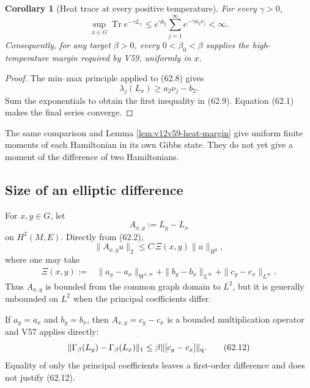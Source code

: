 \documentclass[11pt]{article}
\newtheorem{corollary}[theorem]{Corollary}
\theoremstyle{remark}
\begin{document}
\begin{corollary}[Heat trace at every positive temperature]
\label{cor:v12v62-heat}
For every \(\gamma>0\),
\begin{equation}
 \sup_{x\in G}\operatorname{Tr}e^{-\gamma L_x}
 \leq
 e^{\gamma b_2}
 \sum_{j=1}^\infty e^{-\gamma a_2\nu_j}
 <\infty.                                         \tag{62.9}
\end{equation}
Consequently, for any target \(\beta>0\), every
\(0<\beta_0<\beta\) supplies the high-temperature margin required
by V59, uniformly in \(x\).
\end{corollary}

\begin{proof}
The min--max principle applied to (62.8) gives
\[
 \lambda_j(L_x)\geq a_2\nu_j-b_2.
\]
Sum the exponentials to obtain the first inequality in (62.9).
Equation (62.1) makes the final series converge.
\end{proof}

The same comparison and Lemma \ref{lem:v12v59-heat-margin} give
uniform finite moments of each Hamiltonian in its own Gibbs state.
They do not yet give a moment of the difference of two Hamiltonians.

\subsection{Size of an elliptic difference}

For \(x,y\in G\), let
\[
                         A_{x,y}:=L_y-L_x
\]
on \(H^2(M,E)\).  Directly from (62.2),
\begin{equation}
 \|A_{x,y}u\|_2
 \leq
 C\,\Xi(x,y)\|u\|_{H^2},                          \tag{62.10}
\end{equation}
where one may take
\begin{align}
 \Xi(x,y):={}&
 \|a_y-a_x\|_{W^{1,\infty}}
 +\|b_y-b_x\|_{L^\infty}
 +\|c_y-c_x\|_{L^\infty}.                         \tag{62.11}
\end{align}
Thus \(A_{x,y}\) is bounded from the common graph domain to \(L^2\),
but it is generally unbounded on \(L^2\) when the principal
coefficients differ.

If \(a_y=a_x\) and \(b_y=b_x\), then
\(A_{x,y}=c_y-c_x\) is a bounded multiplication operator and V57
applies directly:
\begin{equation}
 \|\Gamma_\beta(L_y)-\Gamma_\beta(L_x)\|_1
 \leq
 \beta\|[c_y-c_x]\|_{\rm q}.                      \tag{62.12}
\end{equation}
Equality of only the principal coefficients leaves a first-order
difference and does not justify (62.12).
\end{document}
